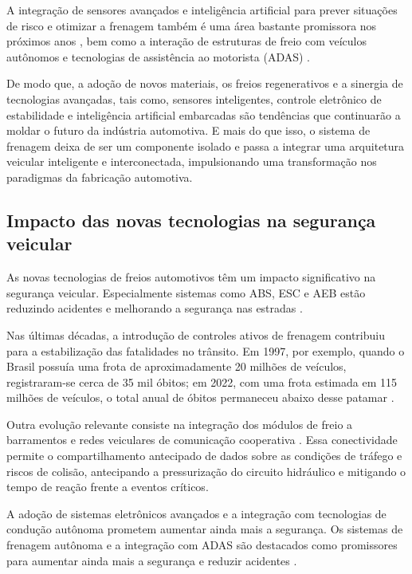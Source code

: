 A integração de sensores avançados e inteligência artificial para prever situações de risco e otimizar a frenagem também é uma área bastante promissora nos próximos anos \cite{Konrad2014}, bem como a interação de estruturas de freio  com veículos autônomos e tecnologias de assistência ao motorista (ADAS) \cite{Donghai2022}.

De modo que, a adoção de novos materiais, os freios regenerativos e a sinergia de tecnologias avançadas, tais como, sensores inteligentes, controle eletrônico de estabilidade e inteligência artificial embarcadas são tendências que continuarão a moldar o futuro da indústria automotiva. E mais do que isso, o sistema de frenagem deixa de ser um componente isolado e passa a integrar uma arquitetura veicular inteligente e interconectada, impulsionando uma transformação nos paradigmas da fabricação automotiva.

\subsection{Impacto das novas tecnologias na segurança veicular}
\label{sec:o-estado-da-arte-7-1}
As novas tecnologias de freios automotivos têm um impacto significativo na segurança veicular. Especialmente sistemas como ABS, ESC e AEB estão reduzindo acidentes e melhorando a segurança nas estradas \cite{Rudolf2011, AndrewJ2022}.

\begin{citacao}
    Nas últimas décadas, a introdução de controles ativos de frenagem contribuiu para a estabilização das fatalidades no trânsito. Em 1997, por exemplo, quando o Brasil possuía uma frota de aproximadamente 20 milhões de veículos, registraram-se cerca de 35 mil óbitos; em 2022, com uma frota estimada em 115 milhões de veículos, o total anual de óbitos permaneceu abaixo desse patamar \cite{bosch2024}.
\end{citacao}

Outra evolução relevante consiste na integração dos módulos de freio a barramentos e redes veiculares de comunicação cooperativa \cite{Konrad2014}. Essa conectividade permite o compartilhamento antecipado de dados sobre as condições de tráfego e riscos de colisão, antecipando a pressurização do circuito hidráulico e mitigando o tempo de reação frente a eventos críticos.

A adoção de sistemas eletrônicos avançados e a integração com tecnologias de condução autônoma prometem aumentar ainda mais a segurança. Os sistemas de frenagem autônoma e a integração com ADAS são destacados como promissores para aumentar ainda mais a segurança e reduzir acidentes \cite{Lentin2022, AndrewJ2022}.

